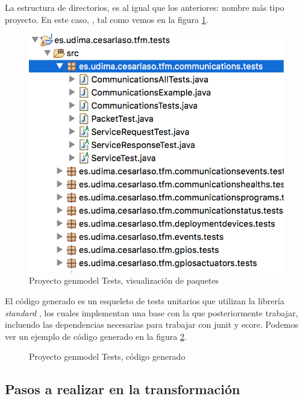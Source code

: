La estructura de directorios, es al igual que los anteriores: nombre más tipo proyecto. En este caso, , tal como vemos en la figura  \ref{fig:modelo_genmodel_tests}.

\begin{figure}
	\centering
    \includegraphics[scale=0.4]{images/emf_capturas/genmodel_tests}
    \sourcepropia{}
    \caption{Proyecto genmodel Tests, visualización de paquetes}
    \label{fig:modelo_genmodel_tests}
\end{figure}


El código generado es un esqueleto de tests unitarios que utilizan la librería \textit{standard} \cite{junit}, los cuales implementan una base con la que posteriormente trabajar, incluendo las dependencias necesarias para trabajar con junit y \gls{ecore}. Podemos ver un ejemplo de código generado en la figura \ref{fig:modelo_genmodel_tests_codigo}.

\begin{figure}
	\centering
	
	
	
    \sourcepropia{}
    \caption{Proyecto genmodel Tests, código generado}
    \label{fig:modelo_genmodel_tests_codigo}
\end{figure}


\subsection{Pasos a realizar en la transformación}

